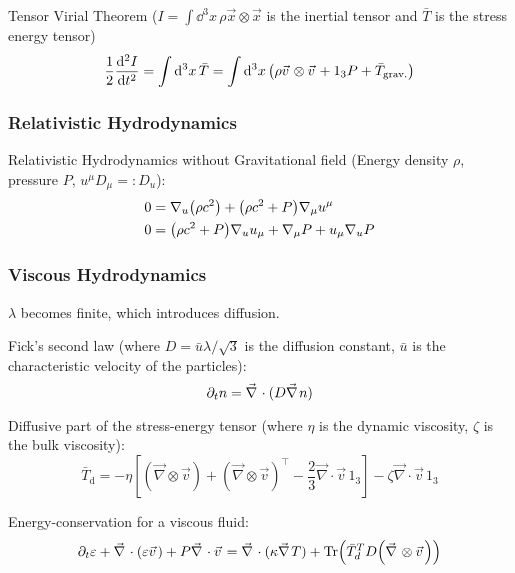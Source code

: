 			\noindent
			Tensor Virial Theorem ($I = 	\int \dd^3 x \, \rho \vec{x} \otimes \vec{x}$ is the inertial tensor and $\bar{T}$ is the stress energy tensor)
			\begin{equation}
				\frac{1}{2}\dv[2]{I}{t}
				= \int \dd^3 x \, \bar{T}
				= \int \dd^3 x \, \qty(\rho \vec{v}\otimes\vec{v} + 1_3 P + \bar{T}_{\text{grav.}})
			\end{equation}

		\subsubsection{Relativistic Hydrodynamics}
			Relativistic Hydrodynamics without Gravitational field (Energy density $\rho$, pressure $P$, $u^\mu D_\mu =: D_u$):
			\begin{equation}
				\begin{aligned}
					0 &= \nabla_u \qty(\rho c^2) + \qty(\rho c^2 + P) \nabla_\mu u^\mu \\
					0 &= \qty(\rho c^2 + P) \nabla_u u_\mu + \nabla_\mu P + u_\mu \nabla_u P \\
				\end{aligned}
			\end{equation}

		\subsubsection{Viscous Hydrodynamics}
			$\lambda$ becomes finite, which introduces diffusion.

			Fick's second law (where $D = \bar{u} \lambda/\sqrt{3}$ is the diffusion constant, $\bar{u}$ is the characteristic velocity of the particles):
			\begin{equation}
				\partial_t n = \Nabla \cdot (D \Nabla n)
			\end{equation}

			\noindent
			Diffusive part of the stress-energy tensor (where $\eta$ is the dynamic viscosity, $\zeta$ is the bulk viscosity):
			\begin{equation}
				\bar{T}_{\mathrm{d}}=-\eta\left[\left(\vec{\nabla}\otimes\vec{v}\right)+\left(\vec{\nabla}\otimes\vec{v}\right)^{\intercal}-\frac{2}{3}\vec{\nabla}\cdot\vec{v}\,1_{3}\right]-\zeta\vec{\nabla}\cdot\vec{v}\,1_{3}
			\end{equation}

			\noindent
			Energy-conservation for a viscous fluid:
			\begin{equation}
				\partial_t \varepsilon + \Nabla \cdot (\varepsilon \vec{v}) + P \Nabla \cdot \vec{v} = \Nabla \cdot (\kappa \Nabla T) + \tr\qty(\bar{T}_d^T D \qty(\Nabla \otimes\vec{v}))
			\end{equation}

